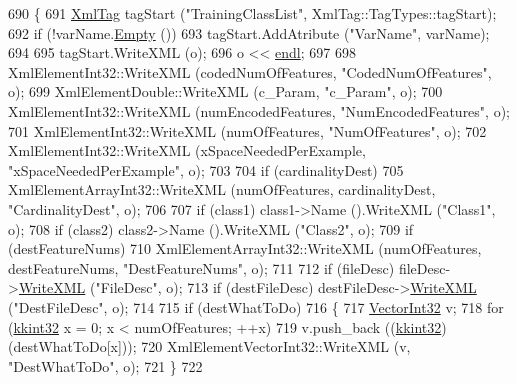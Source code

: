 \begin{DoxyCode}
690 \{
691   \hyperlink{class_k_k_b_1_1_xml_tag}{XmlTag}  tagStart (\textcolor{stringliteral}{"TrainingClassList"}, XmlTag::TagTypes::tagStart);
692   \textcolor{keywordflow}{if}  (!varName.\hyperlink{class_k_k_b_1_1_k_k_str_ac69942f73fffd672ec2a6e1c410afdb6}{Empty} ())
693     tagStart.AddAtribute (\textcolor{stringliteral}{"VarName"}, varName);
694 
695   tagStart.WriteXML (o);
696   o << \hyperlink{namespace_k_k_b_ad1f50f65af6adc8fa9e6f62d007818a8}{endl};
697 
698   XmlElementInt32::WriteXML  (codedNumOfFeatures,     \textcolor{stringliteral}{"CodedNumOfFeatures"},     o);
699   XmlElementDouble::WriteXML (c\_Param,                \textcolor{stringliteral}{"c\_Param"},                o);
700   XmlElementInt32::WriteXML  (numEncodedFeatures,     \textcolor{stringliteral}{"NumEncodedFeatures"},     o);
701   XmlElementInt32::WriteXML  (numOfFeatures,          \textcolor{stringliteral}{"NumOfFeatures"},          o);
702   XmlElementInt32::WriteXML  (xSpaceNeededPerExample, \textcolor{stringliteral}{"xSpaceNeededPerExample"}, o);
703 
704   \textcolor{keywordflow}{if}  (cardinalityDest)
705     XmlElementArrayInt32::WriteXML (numOfFeatures, cardinalityDest, \textcolor{stringliteral}{"CardinalityDest"}, o);
706 
707   \textcolor{keywordflow}{if}  (class1)  class1->Name ().WriteXML (\textcolor{stringliteral}{"Class1"}, o);
708   \textcolor{keywordflow}{if}  (class2)  class2->Name ().WriteXML (\textcolor{stringliteral}{"Class2"}, o);
709   \textcolor{keywordflow}{if}  (destFeatureNums)
710     XmlElementArrayInt32::WriteXML (numOfFeatures, destFeatureNums, \textcolor{stringliteral}{"DestFeatureNums"}, o);
711 
712   \textcolor{keywordflow}{if}  (fileDesc)      fileDesc->\hyperlink{class_k_k_m_l_l_1_1_file_desc_a52dd5520a36027eef50b4d7a613b6fba}{WriteXML}     (\textcolor{stringliteral}{"FileDesc"},     o);
713   \textcolor{keywordflow}{if}  (destFileDesc)  destFileDesc->\hyperlink{class_k_k_m_l_l_1_1_file_desc_a52dd5520a36027eef50b4d7a613b6fba}{WriteXML} (\textcolor{stringliteral}{"DestFileDesc"}, o);
714 
715   \textcolor{keywordflow}{if}  (destWhatToDo)
716   \{
717     \hyperlink{namespace_k_k_b_adf8a10085d231870d8a072046d6cba10}{VectorInt32}  v;
718     \textcolor{keywordflow}{for}  (\hyperlink{namespace_k_k_b_a8fa4952cc84fda1de4bec1fbdd8d5b1b}{kkint32} x = 0;  x < numOfFeatures;  ++x)
719       v.push\_back ((\hyperlink{namespace_k_k_b_a8fa4952cc84fda1de4bec1fbdd8d5b1b}{kkint32})(destWhatToDo[x]));
720     XmlElementVectorInt32::WriteXML (v, \textcolor{stringliteral}{"DestWhatToDo"}, o);
721   \}
722 

\end{DoxyCode}
